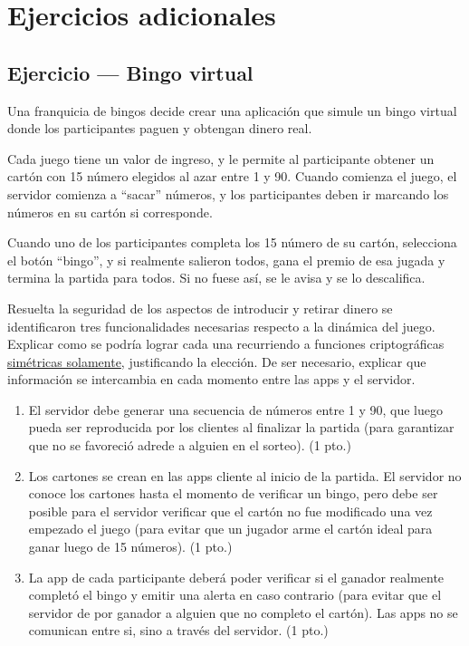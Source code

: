 \section{Ejercicios adicionales}

\subsection{Ejercicio --- Bingo virtual}

\begin{consigna}
Una franquicia de bingos decide crear una aplicación que simule un bingo virtual donde
los participantes paguen y obtengan dinero real.

Cada juego tiene un valor de ingreso, y le permite al participante obtener un cartón con
15 número elegidos al azar entre 1 y 90. Cuando comienza el juego, el servidor comienza a
``sacar'' números, y los participantes deben ir marcando los números en su cartón si
corresponde.

Cuando uno de los participantes completa los 15 número de su cartón, selecciona el botón
``bingo'', y si realmente salieron todos, gana el premio de esa jugada y termina la
partida para todos. Si no fuese así, se le avisa y se lo descalifica.

Resuelta la seguridad de los aspectos de introducir y retirar dinero se identificaron
tres funcionalidades necesarias respecto a la dinámica del juego. Explicar como se podría
lograr cada una recurriendo a funciones criptográficas \underline{simétricas solamente},
justificando la elección. De ser necesario, explicar que información se intercambia en
cada momento entre las apps y el servidor.

\begin{enumerate}
  \item[a)] El servidor debe generar una secuencia de números entre 1 y 90, que luego
  pueda ser reproducida por los clientes al finalizar la partida (para garantizar que no
  se favoreció adrede a alguien en el sorteo). (1 pto.)
  \item[b)] Los cartones se crean en las apps cliente al inicio de la partida. El servidor
  no conoce los cartones hasta el momento de verificar un bingo, pero debe ser posible
  para el servidor verificar que el cartón no fue modificado una vez empezado el juego
  (para evitar que un jugador arme el cartón ideal para ganar luego de 15 números). (1 pto.)
  \item[c)] La app de cada participante deberá poder verificar si el ganador realmente
  completó el bingo y emitir una alerta en caso contrario (para evitar que el servidor de
  por ganador a alguien que no completo el cartón). Las apps no se comunican entre si,
  sino a través del servidor. (1 pto.)
\end{enumerate}


\end{consigna}
